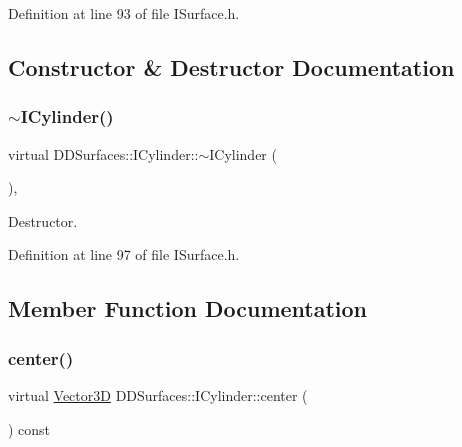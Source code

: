 Definition at line 93 of file I\+Surface.\+h.



\subsection{Constructor \& Destructor Documentation}
\hypertarget{class_d_d_surfaces_1_1_i_cylinder_a8b9d98560a1241956335604eb3c51c16}{}\label{class_d_d_surfaces_1_1_i_cylinder_a8b9d98560a1241956335604eb3c51c16} 
\subsubsection{\texorpdfstring{$\sim$\+I\+Cylinder()}{~ICylinder()}}
{\footnotesize\ttfamily virtual D\+D\+Surfaces\+::\+I\+Cylinder\+::$\sim$\+I\+Cylinder (\begin{DoxyParamCaption}{ }\end{DoxyParamCaption})\hspace{0.3cm}{\ttfamily [inline]}, {\ttfamily [virtual]}}



Destructor. 



Definition at line 97 of file I\+Surface.\+h.



\subsection{Member Function Documentation}
\hypertarget{class_d_d_surfaces_1_1_i_cylinder_acebccc0b84cc5b7e53bb2e56fb991f16}{}\label{class_d_d_surfaces_1_1_i_cylinder_acebccc0b84cc5b7e53bb2e56fb991f16} 
\subsubsection{\texorpdfstring{center()}{center()}}
{\footnotesize\ttfamily virtual \hyperlink{class_d_d_surfaces_1_1_vector3_d}{Vector3D} D\+D\+Surfaces\+::\+I\+Cylinder\+::center (\begin{DoxyParamCaption}{ }\end{DoxyParamCaption}) const\hspace{0.3cm}{\ttfamily [pure virtual]}}



